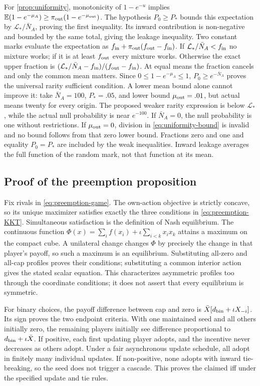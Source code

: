 \documentclass[11pt,a4paper]{article}
\theoremstyle{definition}\newtheorem{definition}{Definition}
\begin{document}
For \cref{prop:uniformity}, monotonicity of $1-e^{-u}$ implies
$\mathbb E(1-e^{-\mu_A})\geq\pi_{\rm out}(1-e^{-\mu_{\rm out}})$.
The hypothesis $P_0\geq P_*$ bounds this expectation by
$\mathcal L_*/\bar N_A$, proving the first inequality. Its inward contribution is
non-negative and bounded by the same total, giving the leakage
inequality. Two constant marks evaluate the expectation as
$f_{\rm in}+\pi_{\rm out}(f_{\rm out}-f_{\rm in})$.
If $\mathcal L_*/\bar N_A<f_{\rm in}$ no mixture works; if it is at least
$f_{\rm out}$ every mixture works. Otherwise the exact upper fraction
is $(\mathcal L_*/\bar N_A-f_{\rm in})/(f_{\rm out}-f_{\rm in})$.
At equal means the fraction cancels and only the common mean matters.
Since $0\leq1-e^{-\mu_A}\leq1$, $P_0\geq e^{-\bar N_A}$ proves the
universal rarity sufficient condition. A lower mean bound alone cannot
improve it: take $\bar N_A=100$, $P_*=.05$, and lower bound
$\mu_{\rm out}=.01$, but actual means twenty for every origin.
The proposed weaker rarity expression is below $\mathcal L_*$, while the actual
null probability is near $e^{-100}$. If $\bar N_A=0$, the null probability
is one without restrictions. If $\mu_{\rm out}=0$, division in
\cref{eq:uniformity-bound} is invalid and no bound follows from that
zero lower bound. Fractions zero and one and equality $P_0=P_*$ are
included by the weak inequalities. Inward leakage averages the full
function of the random mark, not that function at its mean.

\subsection{Proof of the preemption proposition}
\label{app:preemption-proof}
Fix rivals in \cref{eq:preemption-game}. The own-action objective is
strictly concave, so its unique maximizer satisfies exactly the three
conditions in \cref{eq:preemption-KKT}. Simultaneous satisfaction is
the definition of Nash equilibrium. The continuous function
$\Phi(x)=\sum_i f(x_i)+\iota\sum_{i<k}x_ix_k$ attains a maximum on
the compact cube. A unilateral change changes $\Phi$ by precisely the
change in that player's payoff, so such a maximum is an equilibrium.
Substituting all-zero and all-cap profiles proves their conditions;
substituting a common interior action gives the stated scalar equation.
This characterizes asymmetric profiles too through the coordinate
conditions; it does not assert that every equilibrium is symmetric.

For binary choices, the payoff difference between cap and zero is
$\bar X[d_{\rm bin}+\iota X_{-i}]$. Its sign proves the two endpoint
criteria. With one maintained seed and all others initially zero, the
remaining players initially see difference proportional to
$d_{\rm bin}+\iota\bar X$. If positive, each first updating player
adopts, and the incentive never decreases as others adopt. Under a fair
asynchronous update schedule, all adopt in finitely many individual
updates. If non-positive, none adopts with inward tie-breaking, so the
seed does not trigger a cascade. This proves the claimed iff under the
specified update and tie rules.
\end{document}
